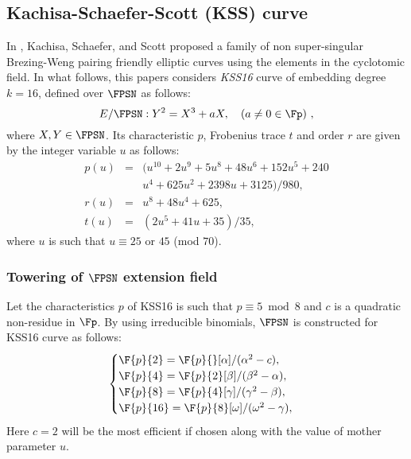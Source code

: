 \subsection{Kachisa-Schaefer-Scott (KSS) curve \cite{EPRINT:KacSchSco07}}
 In  \cite{EPRINT:KacSchSco07}, Kachisa, Schaefer, and Scott proposed a family of non super-singular Brezing-Weng pairing friendly elliptic curves using the elements in the cyclotomic field.  In what follows, this papers considers \textit{KSS16} curve of embedding degree $k =16$, defined over $\FPSN$ as follows:
\begin{equation}\label{eq:KSS_16}
E/\FPSN:Y^2=X^3+aX, \quad \mbox{($a \neq 0 \in \Fp$) },
\end{equation}
 where $X,Y \in \FPSN$. Its characteristic $p$, Frobenius trace $t$ and order $r$ are given by the integer variable $u$ as follows:
\begin{subequations}
\begin{eqnarray}
p(u) &= & (u^{10} +2u^9 +5u^8 +48u^6 +152u^5 +240 \nonumber \\
&&u^4+625u^2 +2398u+3125)/980,  \\\label{eq:kss_16_char}
r(u) &= & u^8 +48u^4 +625,\label{eq:kss_16_degree}  \\
t(u) &=& (2u^5 +41u+35)/35, \label{eq:kss_16_trace} 
\end{eqnarray}
\end{subequations} 
where $u$ is such that $u \equiv 25$ or $45$ (mod $70$).

\subsubsection{Towering of $\FPSN$ extension field}
Let the characteristics $p$ of KSS16 is such that  $p \equiv 5 \bmod 8$  and $c$ is a quadratic non-residue in $\Fp$. By using irreducible binomials, $\FPSN$ is constructed for KSS16 curve  as follows:
\begin{equation}\label{eq_bls_towering}
\begin{cases}
\F{p}{2} = \F{p}{}[\alpha]/(\alpha^2-c),  \\ 
\F{p}{4} = \F{p}{2}[\beta]/(\beta^2-\alpha),  \\ 
\F{p}{8} = \F{p}{4}[\gamma]/(\gamma^2-\beta), \\ 
\F{p}{16} = \F{p}{8}[\omega]/(\omega^2-\gamma), \\ 
\end{cases}
\end{equation}
Here $ c = 2$ will be the most efficient if chosen along with the value of mother parameter $u$.

